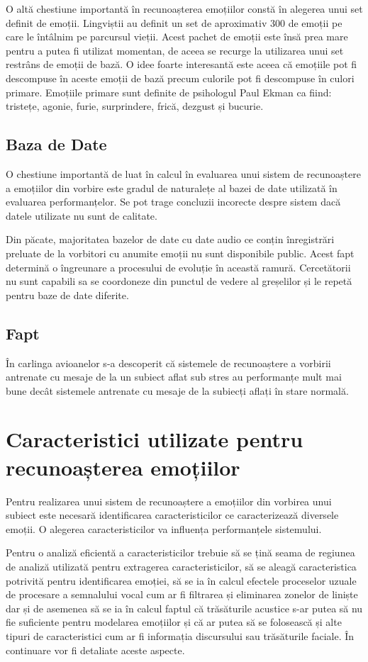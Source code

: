 \documentclass[9pt,shortpaper,twoside,web]{ieeecolor}
\begin{document}
O altă chestiune importantă în recunoașterea emoțiilor constă în alegerea unui set definit de emoții. Lingviștii au definit un set de aproximativ 300 de emoții pe care le întâlnim pe parcursul vieții. Acest pachet de emoții este însă prea mare pentru a putea fi utilizat momentan, de aceea se recurge la utilizarea unui set restrâns de emoții de bază. O idee foarte interesantă este aceea că emoțiile pot fi descompuse în aceste emoții de bază precum culorile pot fi descompuse în culori primare. Emoțiile primare sunt definite de psihologul Paul Ekman ca fiind: tristețe, agonie, furie, surprindere, frică, dezgust și bucurie.


\subsection{Baza de Date}
O chestiune importantă de luat în calcul în evaluarea unui sistem de recunoaștere a emoțiilor din vorbire este gradul de naturalețe al bazei de date utilizată în evaluarea performanțelor. Se pot trage concluzii incorecte despre sistem dacă datele utilizate nu sunt de calitate.

Din păcate, majoritatea bazelor de date cu date audio ce conțin înregistrări preluate de la vorbitori cu anumite emoții nu sunt disponibile public. Acest fapt determină o îngreunare a procesului de evoluție în această ramură. Cercetătorii nu sunt capabili sa se coordoneze din punctul de vedere al greșelilor și le repetă pentru baze de date diferite.


\subsection{Fapt}
În carlinga avioanelor s-a descoperit  că sistemele de recunoaștere a vorbirii antrenate cu mesaje de la un subiect aflat sub stres au performanțe mult mai bune decât sistemele antrenate cu mesaje de la subiecți aflați în stare normală.


\section{Caracteristici utilizate pentru recunoașterea emoțiilor}
Pentru realizarea unui sistem de recunoaștere a emoțiilor din vorbirea unui subiect este necesară identificarea caracteristicilor ce caracterizează diversele emoții. O alegerea caracteristicilor va influența performanțele sistemului.

Pentru o analiză eficientă a caracteristicilor trebuie să se țină seama de regiunea de analiză utilizată pentru extragerea caracteristicilor, să se aleagă caracteristica potrivită pentru identificarea emoției, să se ia în calcul efectele proceselor uzuale de procesare a semnalului vocal cum ar fi filtrarea și eliminarea zonelor de liniște dar și de asemenea să se ia în calcul faptul că trăsăturile acustice s-ar putea să nu fie suficiente pentru modelarea emoțiilor și că ar putea să se folosească și alte tipuri de caracteristici cum ar fi informația discursului sau trăsăturile faciale. În continuare vor fi detaliate aceste aspecte.
\end{document}
